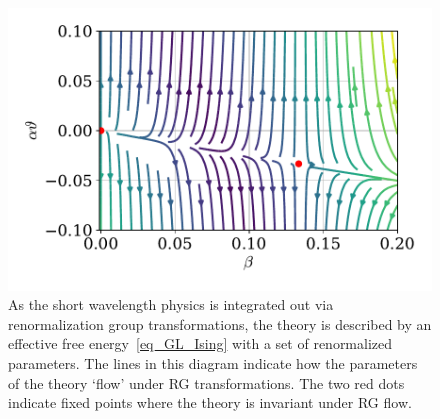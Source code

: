 \begin{figure}[!b]
    \centering
    \includegraphics[width=.4\textwidth]{chapters/Figures/introduction/flow.pdf}
    \caption{
        As the short wavelength physics is integrated out via renormalization group transformations, the theory is described by an effective free energy~\eqref{eq_GL_Ising} with a set of renormalized parameters.
        The lines in this diagram indicate how the parameters of the theory `flow' under RG transformations.
        The two red dots indicate fixed points where the theory is invariant under RG flow.
        }
    \label{fig: flow}
\end{figure}

